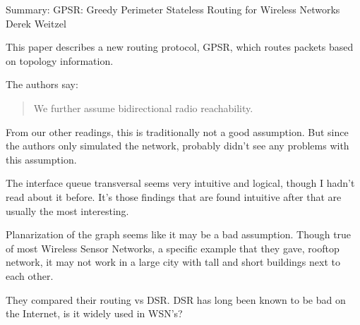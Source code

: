 \documentclass[12pt]{article}
\begin{document}
\begin{center}
{\huge Summary: GPSR: Greedy Perimeter Stateless Routing for Wireless Networks } \\
Derek Weitzel
\end{center}

This paper describes a new routing protocol, GPSR, which routes packets based on topology information.

The authors say:
\begin{quote}
We further assume bidirectional radio reachability.
\end{quote}
From our other readings, this is traditionally not a good assumption.  But since the authors only simulated the network, probably didn't see any problems with this assumption.

The interface queue transversal seems very intuitive and logical, though I hadn't read about it before.  It's those findings that are found intuitive after that are usually the most interesting. 

Planarization of the graph seems like it may be a bad assumption.  Though true of most Wireless Sensor Networks, a specific example that they gave, rooftop network, it may not work in a large city with tall and short buildings next to each other.

They compared their routing vs DSR.  DSR has long been known to be bad on the Internet, is it widely used in WSN's?
\end{document}
